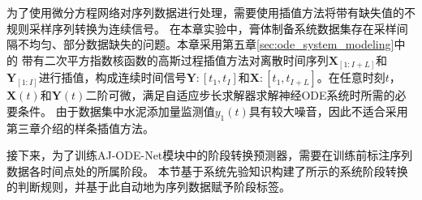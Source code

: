 为了使用微分方程网络对序列数据进行处理，需要使用插值方法将带有缺失值的不规则采样序列转换为连续信号。
在本章实验中，膏体制备系统数据集存在采样间隔不均匀、部分数据缺失的问题。本章采用第五章\ref{sec:ode_system_modeling}中的
带有二次平方指数核函数的高斯过程插值方法对离散时间序列$\boldsymbol X_{[1:I+L]}$和$\boldsymbol Y_{[1:I]}$进行插值，构成连续时间信号$\boldsymbol Y:[t_1,t_{I}]$和$\boldsymbol X:[t_1,t_{I+L}]$。在任意时刻$t$，  $\boldsymbol X(t)$和$\boldsymbol Y(t)$二阶可微，满足自适应步长求解器求解神经ODE系统时所需的必要条件\cite{kidger2020neural}。
由于数据集中水泥添加量监测值$y_1(t)$具有较大噪音，因此不适合采用第三章介绍的样条插值方法。

接下来，为了训练AJ-ODE-Net模块中的阶段转换预测器，需要在训练前标注序列数据各时间点处的所属阶段。
本节基于系统先验知识构建了所示的系统阶段转换的判断规则，并基于此自动地为序列数据赋予阶段标签。

